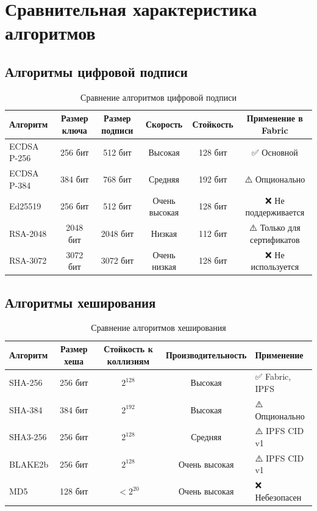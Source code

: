 \documentclass[a4paper,14pt]{extreport}
\begin{document}
\newpage

\chapter{Сравнительная характеристика алгоритмов}

\section{Алгоритмы цифровой подписи}

\begin{table}[H]
\centering
\caption{Сравнение алгоритмов цифровой подписи}
\label{tab:signature_algorithms}
\begin{tabular}{|l|c|c|c|c|c|}
\hline
\textbf{Алгоритм} & \textbf{Размер ключа} & \textbf{Размер подписи} & \textbf{Скорость} & \textbf{Стойкость} & \textbf{Применение в Fabric} \\
\hline
ECDSA P-256 & 256 бит & 512 бит & Высокая & 128 бит & ✅ Основной \\
ECDSA P-384 & 384 бит & 768 бит & Средняя & 192 бит & ⚠️ Опционально \\
Ed25519 & 256 бит & 512 бит & Очень высокая & 128 бит & ❌ Не поддерживается \\
RSA-2048 & 2048 бит & 2048 бит & Низкая & 112 бит & ⚠️ Только для сертификатов \\
RSA-3072 & 3072 бит & 3072 бит & Очень низкая & 128 бит & ❌ Не используется \\
\hline
\end{tabular}
\end{table}

\section{Алгоритмы хеширования}

\begin{table}[H]
\centering
\caption{Сравнение алгоритмов хеширования}
\label{tab:hash_algorithms}
\begin{tabular}{|l|c|c|c|l|}
\hline
\textbf{Алгоритм} & \textbf{Размер хеша} & \textbf{Стойкость к коллизиям} & \textbf{Производительность} & \textbf{Применение} \\
\hline
SHA-256 & 256 бит & $2^{128}$ & Высокая & ✅ Fabric, IPFS \\
SHA-384 & 384 бит & $2^{192}$ & Высокая & ⚠️ Опционально \\
SHA3-256 & 256 бит & $2^{128}$ & Средняя & ⚠️ IPFS CID v1 \\
BLAKE2b & 256 бит & $2^{128}$ & Очень высокая & ⚠️ IPFS CID v1 \\
MD5 & 128 бит & $<2^{20}$ & Очень высокая & ❌ Небезопасен \\
\hline
\end{tabular}
\end{table}
\end{document}

